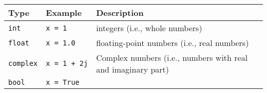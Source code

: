 \documentclass[11pt]{article}
\begin{document}
\begin{longtable}[c]{@{}lll@{}}
\toprule
\begin{minipage}[b]{0.14\columnwidth}\raggedright\strut
Type
\strut\end{minipage} &
\begin{minipage}[b]{0.17\columnwidth}\raggedright\strut
Example
\strut\end{minipage} &
\begin{minipage}[b]{0.61\columnwidth}\raggedright\strut
Description
\strut\end{minipage}\tabularnewline
\midrule
\endhead
\begin{minipage}[t]{0.14\columnwidth}\raggedright\strut
\texttt{int}
\strut\end{minipage} &
\begin{minipage}[t]{0.17\columnwidth}\raggedright\strut
\texttt{x\ =\ 1}
\strut\end{minipage} &
\begin{minipage}[t]{0.61\columnwidth}\raggedright\strut
integers (i.e., whole numbers)
\strut\end{minipage}\tabularnewline
\begin{minipage}[t]{0.14\columnwidth}\raggedright\strut
\texttt{float}
\strut\end{minipage} &
\begin{minipage}[t]{0.17\columnwidth}\raggedright\strut
\texttt{x\ =\ 1.0}
\strut\end{minipage} &
\begin{minipage}[t]{0.61\columnwidth}\raggedright\strut
floating-point numbers (i.e., real numbers)
\strut\end{minipage}\tabularnewline
\begin{minipage}[t]{0.14\columnwidth}\raggedright\strut
\texttt{complex}
\strut\end{minipage} &
\begin{minipage}[t]{0.17\columnwidth}\raggedright\strut
\texttt{x\ =\ 1\ +\ 2j}
\strut\end{minipage} &
\begin{minipage}[t]{0.61\columnwidth}\raggedright\strut
Complex numbers (i.e., numbers with real and imaginary part)
\strut\end{minipage}\tabularnewline
\begin{minipage}[t]{0.14\columnwidth}\raggedright\strut
\texttt{bool}
\strut\end{minipage} &
\begin{minipage}[t]{0.17\columnwidth}\raggedright\strut
\texttt{x\ =\ True}

\end{minipage}
\end{longtable}
\end{document}
